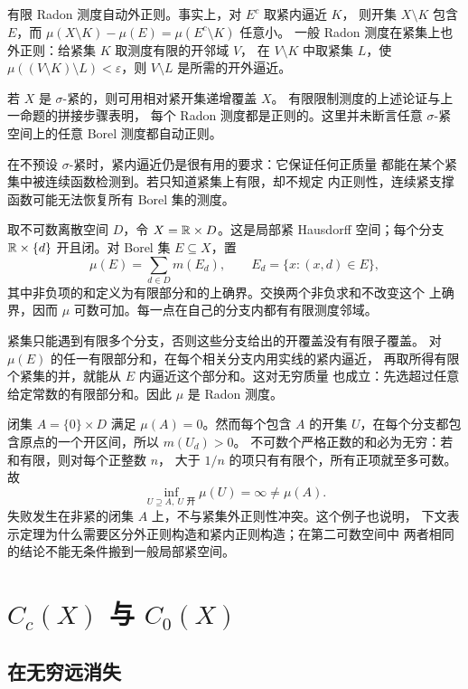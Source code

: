 有限 Radon 测度自动外正则。事实上，对 \(E^c\) 取紧内逼近 \(K\)，
则开集 \(X\setminus K\) 包含 \(E\)，而
\(\mu(X\setminus K)-\mu(E)=\mu(E^c\setminus K)\) 任意小。
一般 Radon 测度在紧集上也外正则：给紧集 \(K\) 取测度有限的开邻域 \(V\)，
在 \(V\setminus K\) 中取紧集 \(L\)，使
\(\mu((V\setminus K)\setminus L)<\varepsilon\)，则
\(V\setminus L\) 是所需的开外逼近。

若 \(X\) 是 \(\sigma\)-紧的，则可用相对紧开集递增覆盖 \(X\)。
有限限制测度的上述论证与上一命题的拼接步骤表明，
每个 Radon 测度都是正则的。这里并未断言任意
\(\sigma\)-紧空间上的任意 Borel 测度都自动正则。

在不预设 \(\sigma\)-紧时，紧内逼近仍是很有用的要求：它保证任何正质量
都能在某个紧集中被连续函数检测到。若只知道紧集上有限，却不规定
内正则性，连续紧支撑函数可能无法恢复所有 Borel 集的测度。

\begin{example}[紧内正则不保证全局外正则]
\label{ex:radon-not-outer-regular}
取不可数离散空间 \(D\)，令 \(X=\mathbb{R}\times D\)。这是局部紧 Hausdorff
空间；每个分支 \(\mathbb{R}\times\{d\}\) 开且闭。对 Borel 集 \(E\subseteq X\)，置
\[
 \mu(E)=\sum_{d\in D}m(E_d),\qquad
 E_d=\{x:(x,d)\in E\},
\]
其中非负项的和定义为有限部分和的上确界。交换两个非负求和不改变这个
上确界，因而 \(\mu\) 可数可加。每一点在自己的分支内都有有限测度邻域。

紧集只能遇到有限多个分支，否则这些分支给出的开覆盖没有有限子覆盖。
对 \(\mu(E)\) 的任一有限部分和，在每个相关分支内用实线的紧内逼近，
再取所得有限个紧集的并，就能从 \(E\) 内逼近这个部分和。这对无穷质量
也成立：先选超过任意给定常数的有限部分和。因此 \(\mu\) 是 Radon 测度。

闭集 \(A=\{0\}\times D\) 满足 \(\mu(A)=0\)。然而每个包含 \(A\)
的开集 \(U\)，在每个分支都包含原点的一个开区间，所以 \(m(U_d)>0\)。
不可数个严格正数的和必为无穷：若和有限，则对每个正整数 \(n\)，
大于 \(1/n\) 的项只有有限个，所有正项就至多可数。故
\[
 \inf_{U\supseteq A,\ U\text{ 开}}\mu(U)=\infty\ne\mu(A).
\]
失败发生在非紧的闭集 \(A\) 上，不与紧集外正则性冲突。这个例子也说明，
下文表示定理为什么需要区分外正则构造和紧内正则构造；在第二可数空间中
两者相同的结论不能无条件搬到一般局部紧空间。
\end{example}

\section{\texorpdfstring{\(C_c(X)\) 与 \(C_0(X)\)}{Cc(X) 与 C0(X)}}
\label{sec:cc-czero}

\subsection{在无穷远消失}

